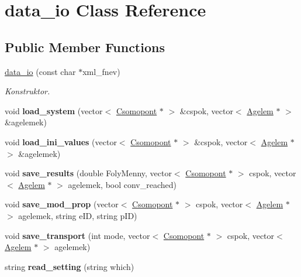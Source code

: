 \hypertarget{classdata__io}{}\section{data\+\_\+io Class Reference}
\label{classdata__io}
\subsection*{Public Member Functions}
\begin{DoxyCompactItemize}
\item 
\hyperlink{classdata__io_ab2af4a1c42da224e002c9221f7117129}{data\+\_\+io} (const char $\ast$xml\+\_\+fnev)\hypertarget{classdata__io_ab2af4a1c42da224e002c9221f7117129}{}\label{classdata__io_ab2af4a1c42da224e002c9221f7117129}

\begin{DoxyCompactList}\small\item\em Konstruktor. \end{DoxyCompactList}\item 
void {\bfseries load\+\_\+system} (vector$<$ \hyperlink{class_csomopont}{Csomopont} $\ast$ $>$ \&cspok, vector$<$ \hyperlink{class_agelem}{Agelem} $\ast$ $>$ \&agelemek)\hypertarget{classdata__io_a653534a1d58a63b8f4636b3f3ae95a59}{}\label{classdata__io_a653534a1d58a63b8f4636b3f3ae95a59}

\item 
void {\bfseries load\+\_\+ini\+\_\+values} (vector$<$ \hyperlink{class_csomopont}{Csomopont} $\ast$ $>$ \&cspok, vector$<$ \hyperlink{class_agelem}{Agelem} $\ast$ $>$ \&agelemek)\hypertarget{classdata__io_a309e1aee17df2a0c97d25aa367217831}{}\label{classdata__io_a309e1aee17df2a0c97d25aa367217831}

\item 
void {\bfseries save\+\_\+results} (double Foly\+Menny, vector$<$ \hyperlink{class_csomopont}{Csomopont} $\ast$ $>$ cspok, vector$<$ \hyperlink{class_agelem}{Agelem} $\ast$ $>$ agelemek, bool conv\+\_\+reached)\hypertarget{classdata__io_aaaa700ff8221eea7a326960e3e9fb9bd}{}\label{classdata__io_aaaa700ff8221eea7a326960e3e9fb9bd}

\item 
void {\bfseries save\+\_\+mod\+\_\+prop} (vector$<$ \hyperlink{class_csomopont}{Csomopont} $\ast$ $>$ cspok, vector$<$ \hyperlink{class_agelem}{Agelem} $\ast$ $>$ agelemek, string e\+ID, string p\+ID)\hypertarget{classdata__io_a1e50eb970f268d6afde52b843e5881b2}{}\label{classdata__io_a1e50eb970f268d6afde52b843e5881b2}

\item 
void {\bfseries save\+\_\+transport} (int mode, vector$<$ \hyperlink{class_csomopont}{Csomopont} $\ast$ $>$ cspok, vector$<$ \hyperlink{class_agelem}{Agelem} $\ast$ $>$ agelemek)\hypertarget{classdata__io_a865a3cdeb6f80bd628a28f96b2636f35}{}\label{classdata__io_a865a3cdeb6f80bd628a28f96b2636f35}

\item 
string {\bfseries read\+\_\+setting} (string which)\hypertarget{classdata__io_a2bef52b6a28b450a5887c0483ff1e4a7}{}\label{classdata__io_a2bef52b6a28b450a5887c0483ff1e4a7}

\end{DoxyCompactItemize}


